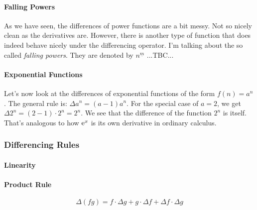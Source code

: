 \paragraph{Falling Powers}
As we have seen, the differences of power functions are a bit messy. Not so nicely clean as the derivatives are. However, there is another type of function that does indeed behave nicely under the differencing operator. I'm talking about the so called \emph{falling powers}. They are denoted by $n^{\underline{m}}$ ...TBC...





\paragraph{Exponential Functions}
Let's now look at the differences of exponential functions of the form $f(n) = a^n$. The general rule is: $\Delta a^n = (a-1) a^n$. For the special case of $a=2$, we get $\Delta 2^n = (2-1) \cdot 2^n = 2^n$. We see that the difference of the function $2^n$ is itself. That's analogous to how $\operatorname{\mathrm{e}}^x$ is its own derivative in ordinary calculus.









\subsubsection{Differencing Rules}  



\paragraph{Linearity}

\paragraph{Product Rule}
\begin{equation}
 \Delta (f g) = f \cdot \Delta g + g \cdot \Delta f + \Delta f \cdot \Delta g
\end{equation}

